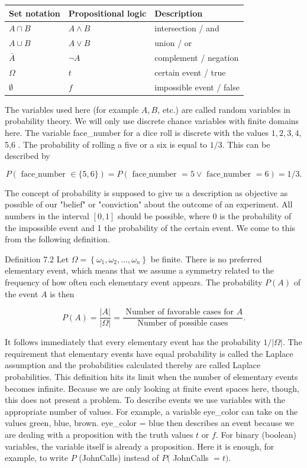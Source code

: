 \documentclass[10pt]{book}
\begin{document}
\begin{center}
\begin{enumerate}
\begin{center}
\begin{tabular}{|l|l|l|}
\hline
Set notation & Propositional logic & Description \\
\hline
$A \cap B$ & $A \wedge B$ & intersection / and \\
\hline
$A \cup B$ & $A \vee B$ & union / or \\
\hline
$\bar{A}$ & $\neg A$ & complement / negation \\
\hline
$\Omega$ & $t$ & certain event / true \\
\hline
$\emptyset$ & $f$ & impossible event / false \\
\hline
\end{tabular}
\end{center}

The variables used here (for example $A, B$, etc.) are called random variables in probability theory. We will only use discrete chance variables with finite domains here. The variable face\_number for a dice roll is discrete with the values $1,2,3,4$, 5,6 . The probability of rolling a five or a six is equal to $1 / 3$. This can be described by

$$
P(\text { face_number } \in\{5,6\})=P(\text { face_number }=5 \vee \text { face_number }=6)=1 / 3 .
$$

The concept of probability is supposed to give us a description as objective as possible of our "belief" or "conviction" about the outcome of an experiment. All numbers in the interval $[0,1]$ should be possible, where 0 is the probability of the impossible event and 1 the probability of the certain event. We come to this from the following definition.

Definition 7.2 Let $\Omega=\left\{\omega_{1}, \omega_{2}, \ldots, \omega_{n}\right\}$ be finite. There is no preferred elementary event, which means that we assume a symmetry related to the frequency of how often each elementary event appears. The probability $P(A)$ of the event $A$ is then

$$
P(A)=\frac{|A|}{|\Omega|}=\frac{\text { Number of favorable cases for } A}{\text { Number of possible cases }} .
$$

It follows immediately that every elementary event has the probability $1 /|\Omega|$. The requirement that elementary events have equal probability is called the Laplace assumption and the probabilities calculated thereby are called Laplace probabilities. This definition hits its limit when the number of elementary events becomes infinite. Because we are only looking at finite event spaces here, though, this does not present a problem. To describe events we use variables with the appropriate number of values. For example, a variable eye\_color can take on the values green, blue, brown. eye\_color = blue then describes an event because we are dealing with a proposition with the truth values $t$ or $f$. For binary (boolean) variables, the variable itself is already a proposition. Here it is enough, for example, to write $P$ (JohnCalls) instead of $P($ JohnCalls $=t)$.


\end{enumerate}
\end{center}
\end{document}
